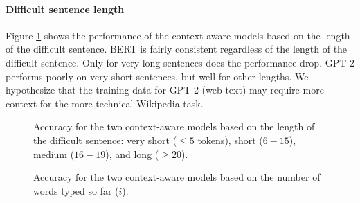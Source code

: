 \documentclass[11pt]{article}
\begin{document}
\vspace{-1mm}
\paragraph{Difficult sentence length} Figure \ref{fig:length_based} shows the performance of the context-aware models based on the length of the difficult sentence.  BERT is fairly consistent regardless of the length of the difficult sentence.  Only for very long sentences does the performance drop.  GPT-2 performs poorly on very short sentences, but well for other lengths.  We hypothesize that the training data for GPT-2 (web text) may require more context for the more technical Wikipedia task. 

\begin{figure}[t]
\caption{\footnotesize \label{fig:length_based} Accuracy for the two context-aware models based on the length of the difficult sentence: very short ($\le 5$ tokens), short ($6-15$), medium ($16-19$), and long ($\ge20$).}
\vspace{-2mm}
\end{figure}

\begin{figure}[t]
\caption{Accuracy for the two context-aware models based on the number of words typed so far ($i$).}
\label{fig:position_based}
\vspace{-2mm}
\end{figure}
\end{document}
